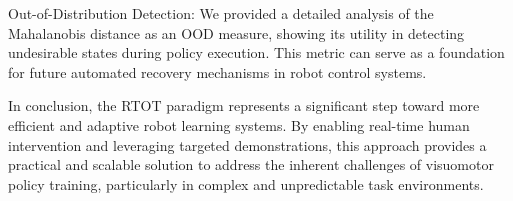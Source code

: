 Out-of-Distribution Detection: We provided a detailed analysis of the Mahalanobis distance as an OOD measure, showing its utility in detecting undesirable states during policy execution. This metric can serve as a foundation for future automated recovery mechanisms in robot control systems.


In conclusion, the RTOT paradigm represents a significant step toward more efficient and adaptive robot learning systems. By enabling real-time human intervention and leveraging targeted demonstrations, this approach provides a practical and scalable solution to address the inherent challenges of visuomotor policy training, particularly in complex and unpredictable task environments.